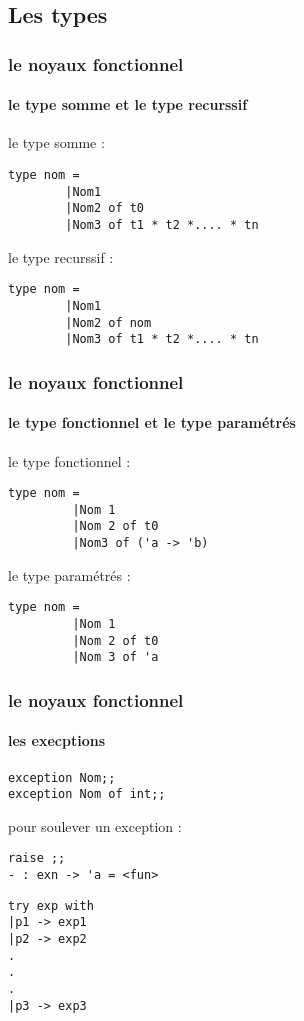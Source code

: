       \subsection{Les types}
\begin{frame}[fragile]
	\frametitle{le noyaux fonctionnel}
	\framesubtitle{le type somme et le type recurssif}
	le type somme :
	\begin{lstlisting}
type nom =
        |Nom1 
        |Nom2 of t0 
        |Nom3 of t1 * t2 *.... * tn 
	\end{lstlisting}
	le type recurssif :
	\begin{lstlisting}
type nom =
        |Nom1
        |Nom2 of nom
        |Nom3 of t1 * t2 *.... * tn
         \end{lstlisting}
\end{frame}

\begin{frame}[fragile]
  \frametitle{le noyaux fonctionnel}
  \framesubtitle{le type fonctionnel et le type paramétrés}
  le type fonctionnel : 
  \begin{lstlisting}
type nom =
         |Nom 1
         |Nom 2 of t0
         |Nom3 of ('a -> 'b)
  \end{lstlisting}
  le type paramétrés :
  \begin{lstlisting}
type nom = 
         |Nom 1 
         |Nom 2 of t0
         |Nom 3 of 'a 
  \end{lstlisting}
\end{frame}

\begin{frame}[fragile]
  \frametitle{le noyaux fonctionnel}
  \framesubtitle{les execptions}
  \begin{lstlisting}
exception Nom;;
exception Nom of int;;
  \end{lstlisting}
pour soulever un exception : 
\begin{lstlisting}
raise ;;
- : exn -> 'a = <fun>
\end{lstlisting}
\begin{lstlisting}
try exp with 
|p1 -> exp1
|p2 -> exp2
.
.
.
|p3 -> exp3
\end{lstlisting}

\end{frame}
